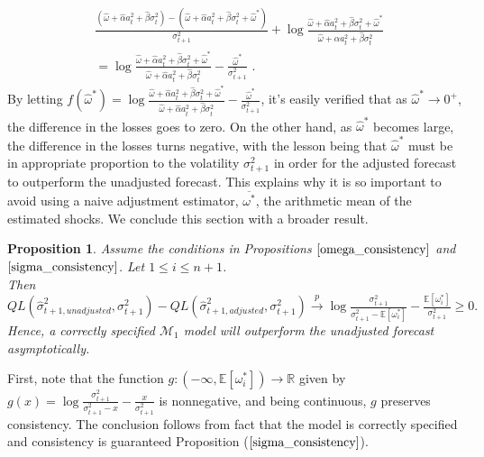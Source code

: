 \documentclass[11pt]{article}
\def\mc#1{\mathcal{#1}} %
\def\E{\mathbb{E}} %
\def\mc#1{\mathcal{#1}}
\newtheorem{prop}{Proposition}
\theoremstyle{definition}
\newenvironment{proof-of-proposition}[1][{}]{\noindent{\bf
    Proof of Proposition {#1}}
  \hspace*{.5em}}{\qed\bigskip\\}
\begin{document}
\begin{align*}
   &\frac{(\hat\omega + \hat\alpha a_{t}^{2} + \hat\beta\sigma^{2}_{t})-(\hat\omega + \hat\alpha a_{t}^{2} + \hat\beta\sigma_{t}^{2} + \hat\omega^{*})}{\sigma_{t+1}^{2}} + \log{\frac{\hat\omega + \hat\alpha a_{t}^{2} + \hat\beta\sigma_{t}^{2} + \hat\omega^{*}}{\hat\omega + \hat\alpha a_{t}^{2} + \hat\beta\sigma_{t}^{2}}}\\
   & = \log{\frac{\hat\omega + \hat\alpha a_{t}^{2} + \hat\beta\sigma_{t}^{2} + \hat\omega^{*}}{\hat\omega + \hat\alpha a_{t}^{2} + 
   \hat\beta\sigma_{t}^{2}}} - \frac{\hat\omega^{*}}{\sigma^{2}_{t+1}} \text{ .} 
\end{align*}\label{QL Loss Consistency - GARCH(1,1)} 
By letting $f(\hat\omega^{*}) = \log{\frac{\hat\omega + \hat\alpha a_{t}^{2} + \hat\beta\sigma_{t}^{2} + \hat\omega^{*}}{\hat\omega + \hat\alpha a_{t}^{2} + \hat\beta\sigma_{t}^{2}}} - \frac{\hat\omega^{*}}{\sigma^{2}_{t+1}}$, it's easily verified that as $\hat\omega^{*} \rightarrow 0^{+}$, the difference in the losses goes to zero.  On the other hand, as $\hat\omega^{*}$ becomes large, the difference in the losses turns negative, with the lesson being that $\hat\omega^{*}$ must be in appropriate proportion to the volatility $\sigma^{2}_{t+1}$ in order for the adjusted forecast to outperform the unadjusted forecast.  This explains why it is so important to avoid using a naive adjustment estimator, $\overline{\omega^{*}}$, the arithmetic mean of the estimated shocks.  We conclude this section with a broader result. 

\begin{prop}\label{asymptotic_consistency}
Assume the conditions in Propositions $\ref{omega_consistency}$ and $\ref{sigma_consistency}$.  Let $1\leq i\leq n+1$.\\
  Then $QL(\hat\sigma_{t+1, unadjusted}^{2},\sigma^{2}_{t+1})-QL(\hat\sigma^{2}_{t+1, adjusted},\sigma^{2}_{t+1})\xrightarrow{p} \log{\frac{\sigma^{2}_{t+1}}{\sigma_{t+1}^{2}-\E[\omega_{i}^{*}]}} - \frac{\E[\omega_{i}^{*}]}{\sigma^{2}_{t+1}} \geq 0.$
Hence, a correctly specified $\mc{M}_1$ model will outperform the unadjusted forecast asymptotically.
\end{prop}

\begin{proof-of-proposition}
  First, note that the function $g:(-\infty,\E[\omega_{i}^{*}])\rightarrow \mathbb{R}$ given by $g(x) = \log{\frac{\sigma^{2}_{t+1}}{\sigma_{t+1}^{2}-x}} - \frac{x}{\sigma^{2}_{t+1}}$ is nonnegative, and being continuous, $g$ preserves consistency. The conclusion follows from fact that the model is correctly specified and consistency is guaranteed Proposition ($\ref{sigma_consistency}$). 
  
\end{proof-of-proposition}
\end{document}
